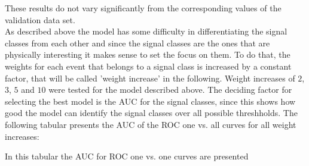 These results do not vary significantly from the corresponding values of the validation data set. \\

As described above the model has some difficulty in differentiating the signal classes from each other and since the signal classes are the ones that are physically interesting it makes
sense to set the focus on them. To do that, the weights for each event that belongs to a signal class is increased by a constant factor, that will be called 'weight increase' in the following. 
Weight increases of $2$, $3$, $5$ and $10$ were tested for the model described above. The deciding factor for selecting the best model is the AUC for the signal classes, since this shows
how good the model can identify the signal classes over all possible threshholds. The following tabular presents the AUC of the ROC one vs. all curves for all weight increases:


In this tabular the AUC for ROC one vs. one curves are presented


